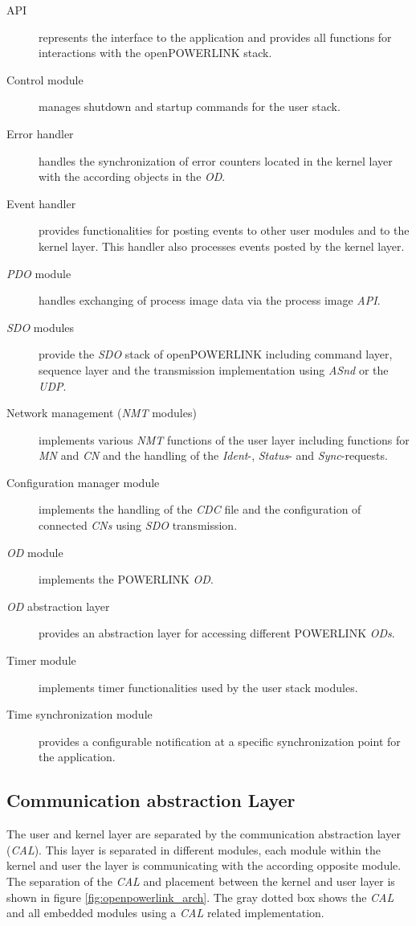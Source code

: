 \begin{description}
    \item[API] represents the interface to the application and provides all functions for interactions with the openPOWERLINK stack.
    \item[Control module] manages shutdown and startup commands for the user stack.
    \item[Error handler] handles the synchronization of error counters located in the kernel layer with the according objects in the \emph{OD}.
    \item[Event handler] provides functionalities for posting events to other user modules and to the kernel layer.
    This handler also processes events posted by the kernel layer.
    \item[\emph{PDO} module] handles exchanging of process image data via the process image \emph{API}.
    \item[\emph{SDO} modules] provide the \emph{SDO} stack of openPOWERLINK including command layer, sequence layer and the transmission implementation using \emph{ASnd} or the \emph{UDP}.
    \item[Network management (\emph{NMT} modules)] implements various \emph{NMT} functions of the user layer including functions for \emph{MN} and \emph{CN} and the handling of the \emph{Ident}-, \emph{Status}- and \emph{Sync}-requests.
    \item[Configuration manager module] implements the handling of the \emph{CDC} file and the configuration of connected \emph{CNs} using \emph{SDO} transmission.
    \item[\emph{OD} module] implements the POWERLINK \emph{OD}.
    \item[\emph{OD} abstraction layer] provides an abstraction layer for accessing different POWERLINK \emph{ODs}.
    \item[Timer module] implements timer functionalities used by the user stack modules.
    \item[Time synchronization module] provides a configurable notification at a specific synchronization point for the application.
\end{description}

\subsection{Communication abstraction Layer}
\label{sec:oplk_architecture_cal}

The user and kernel layer are separated by the communication abstraction layer (\emph{CAL}).
This layer is separated in different modules, each module within the kernel and user the layer is communicating with the according opposite module.
The separation of the \emph{CAL} and placement between the kernel and user layer is shown in figure \ref{fig:openpowerlink_arch}.
The gray dotted box shows the \emph{CAL} and all embedded modules using a \emph{CAL} related implementation.

